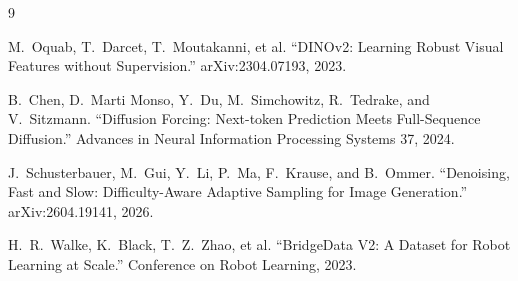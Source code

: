 \documentclass[10pt,a4paper]{article}
\begin{document}
\begin{thebibliography}{9}

M.~Oquab, T.~Darcet, T.~Moutakanni, et al.
``DINOv2: Learning Robust Visual Features without Supervision.''
arXiv:2304.07193, 2023.

B.~Chen, D.~Marti Monso, Y.~Du, M.~Simchowitz, R.~Tedrake, and V.~Sitzmann.
``Diffusion Forcing: Next-token Prediction Meets Full-Sequence Diffusion.''
Advances in Neural Information Processing Systems 37, 2024.

J.~Schusterbauer, M.~Gui, Y.~Li, P.~Ma, F.~Krause, and B.~Ommer.
``Denoising, Fast and Slow: Difficulty-Aware Adaptive Sampling for Image Generation.''
arXiv:2604.19141, 2026.

H.~R.~Walke, K.~Black, T.~Z.~Zhao, et al.
``BridgeData V2: A Dataset for Robot Learning at Scale.''
Conference on Robot Learning, 2023.

\end{thebibliography}
\end{document}
